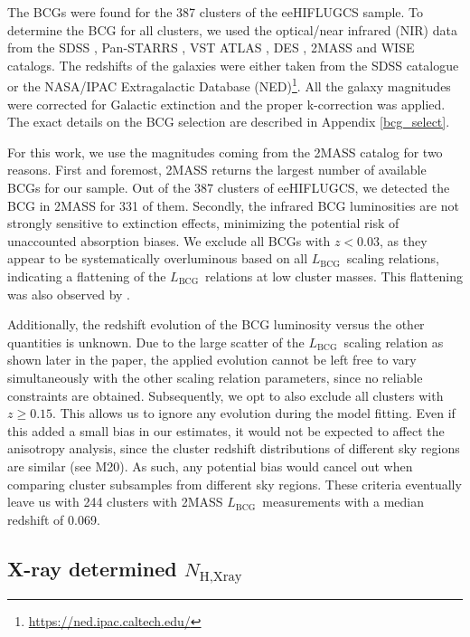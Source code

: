 \documentclass{aa}   %
\newcommand{\Lbcg}{$L_{\text{BCG}}$}
\begin{document}
The BCGs were found for the 387 clusters of the eeHIFLUGCS sample. To determine the BCG for all clusters, we used the optical/near infrared (NIR) data from the SDSS \citep{york2000sloan}, Pan-STARRS \citep{kaiser2002pan,kaiser2010pan}, VST ATLAS \citep{shanks2015vlt}, DES \citep{abbott2018dark}, 2MASS \citep{skrutskie2006two} and WISE \citep{wright2010wide} catalogs. The redshifts of the galaxies were either taken from the SDSS catalogue or the NASA/IPAC Extragalactic Database (NED)\footnote{\url{https://ned.ipac.caltech.edu/}}. All the galaxy magnitudes were corrected for Galactic extinction and the proper k-correction was applied. The exact details on the BCG selection are described in Appendix \ref{bcg_select}.

For this work, we use the magnitudes coming from the 2MASS catalog for two reasons. First and foremost, 2MASS returns the largest number of available BCGs for our sample. Out of the 387 clusters of eeHIFLUGCS, we detected the BCG in 2MASS for 331 of them. Secondly, the infrared BCG luminosities are not strongly sensitive to extinction effects, minimizing the potential risk of unaccounted absorption biases. We exclude all BCGs with $z<0.03$, as they appear to be systematically overluminous based on all \Lbcg\ scaling relations, indicating a flattening of the \Lbcg\ relations at low cluster masses. This flattening was also observed by \citet{bharad14}. 

Additionally, the redshift evolution of the BCG luminosity versus the other quantities is unknown. Due to the large scatter of the \Lbcg\ scaling relation as shown later in the paper, the applied evolution cannot be left free to vary simultaneously with the other scaling relation parameters, since no reliable constraints are obtained. Subsequently, we opt to also exclude all clusters with $z\geq 0.15$. This allows us to ignore any evolution during the model fitting. Even if this added a small bias in our estimates, it would not be expected to affect the anisotropy analysis, since the cluster redshift distributions of different sky regions are similar (see M20). As such, any potential bias would cancel out when comparing cluster subsamples from different sky regions. These criteria eventually leave us with 244 clusters with 2MASS \Lbcg\ measurements with a median redshift of 0.069.

\subsection{X-ray determined $N_{\text{H,Xray}}$}\label{xray_nh}
\end{document}
